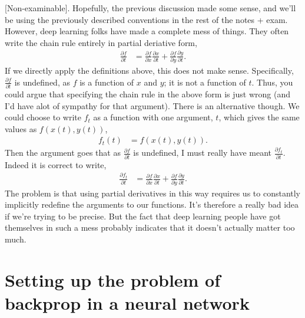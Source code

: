 \documentclass{article}
\newcommand{\dd}[2][]{\frac{\partial #1}{\partial #2}}
\begin{document}
[Non-examinable]. 
Hopefully, the previous discussion made some sense, and we'll be using the previously described conventions in the rest of the notes + exam.
However, deep learning folks have made a complete mess of things.
They often write the chain rule entirely in partial deriative form,
\begin{align}
  \dd[f]{t} &= \dd[f]{x} \dd[x]{t} + \dd[f]{y} \dd[y]{t}.
\end{align}
If we directly apply the definitions above, this does not make sense. 
Specifically, $\dd[f]{t}$ is undefined, as $f$ is a function of $x$ and $y$; it is not a function of $t$.
Thus, you could argue that specifying the chain rule in the above form is just wrong (and I'd have alot of sympathy for that argument).
There is an alternative though. 
We could choose to write $f_t$ as a function with one argument, $t$, which gives the same values as $f(x(t), y(t))$,
\begin{align}
  f_t(t) &= f(x(t), y(t)).
\end{align}
Then the argument goes that as $\dd[f]{t}$ is undefined, I must really have meant $\dd[f_t]{t}$.
Indeed it is correct to write,
\begin{align}
  \dd[f_t]{t} &= \dd[f]{x} \dd[x]{t} + \dd[f]{y} \dd[y]{t}.
\end{align}
The problem is that using partial derivatives in this way requires us to constantly implicitly redefine the arguments to our functions. 
It's therefore a really bad idea if we're trying to be precise.
But the fact that deep learning people have got themselves in such a mess probably indicates that it doesn't actually matter too much.

\section{Setting up the problem of backprop in a neural network}
\end{document}
